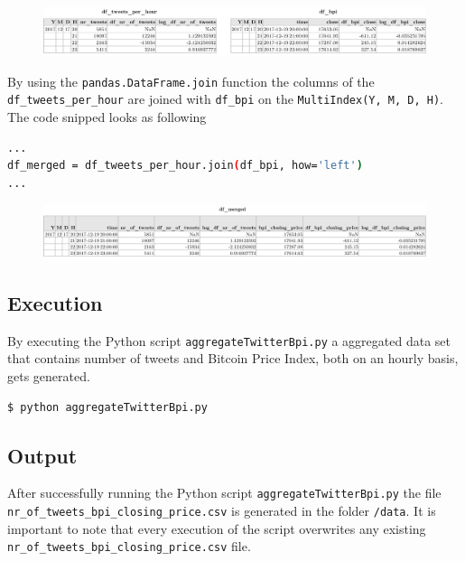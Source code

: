 \documentclass[a4paper,12pt]{article}
\begin{document}
\begin{spacing}{1.2}
\begin{figure}[H]
    \centering
    \includegraphics[scale=0.52]{dfseperate.png}
\end{figure}
By using the \verb|pandas.DataFrame.join| function the columns of the  \verb|df_tweets_per_hour| are joined with  \verb|df_bpi| on the  \verb|MultiIndex(Y, M, D, H)|. The code snipped looks as following\:
\begin{lstlisting}[language=bash]
...
df_merged = df_tweets_per_hour.join(df_bpi, how='left')
...
\end{lstlisting}
\begin{figure}[H]
    \centering
    \includegraphics[scale=0.52]{dfmerged.png}
\end{figure}

\subsection{Execution}
By executing the Python script \verb|aggregateTwitterBpi.py| a aggregated data set that contains number of tweets and Bitcoin Price Index, both on an hourly basis, gets generated. 
\begin{lstlisting}[language=bash]
    $ python aggregateTwitterBpi.py
\end{lstlisting}

\subsection{Output}
After successfully running the Python script \verb|aggregateTwitterBpi.py| the file \verb|nr_of_tweets_bpi_closing_price.csv| is generated in the folder \verb|/data|. It is important to note that every execution of the script overwrites any existing \verb|nr_of_tweets_bpi_closing_price.csv| file.


\end{spacing}
\end{document}
